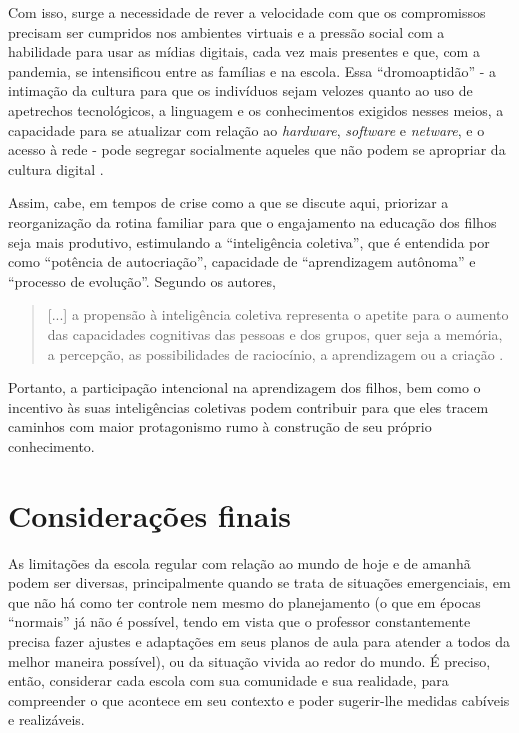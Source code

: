 \documentclass{textolivre}
\begin{document}
Com isso, surge a necessidade de rever a velocidade com que os compromissos precisam ser cumpridos nos ambientes virtuais e a pressão social com a habilidade para usar as mídias digitais, cada vez mais presentes e que, com a pandemia, se intensificou entre as famílias e na escola. Essa “dromoaptidão” - a intimação da cultura para que os indivíduos sejam velozes quanto ao uso de apetrechos tecnológicos, a linguagem e os conhecimentos exigidos nesses meios, a capacidade para se atualizar com relação ao \textit{hardware}, \textit{software} e \textit{netware}, e o acesso à rede - pode segregar socialmente aqueles que não podem se apropriar da cultura digital \cite{boechat_as_2017}.
	
Assim, cabe, em tempos de crise como a que se discute aqui, priorizar a reorganização da rotina familiar para que o engajamento na educação dos filhos seja mais produtivo, estimulando a “inteligência coletiva”, que é entendida por \textcite{lemos_o_2014} como “potência de autocriação”, capacidade de “aprendizagem autônoma” e “processo de evolução”. Segundo os autores,

\begin{quote}
    [...] a propensão à inteligência coletiva representa o apetite para o aumento das capacidades cognitivas das pessoas e dos grupos, quer seja a memória, a percepção, as possibilidades de raciocínio, a aprendizagem ou a criação \cite[p. 14, grifos dos autores]{lemos_o_2014}.
\end{quote}

Portanto, a participação intencional na aprendizagem dos filhos, bem como o incentivo às suas inteligências coletivas podem contribuir para que eles tracem caminhos com maior protagonismo rumo à construção de seu próprio conhecimento.

\section{Considerações finais}\label{sec-organizacao}
As limitações da escola regular com relação ao mundo de hoje e de amanhã podem ser diversas, principalmente quando se trata de situações emergenciais, em que não há como ter controle nem mesmo do planejamento (o que em épocas “normais” já não é possível, tendo em vista que o professor constantemente precisa fazer ajustes e adaptações em seus planos de aula para atender a todos da melhor maneira possível), ou da situação vivida ao redor do mundo. É preciso, então, considerar cada escola com sua comunidade e sua realidade, para compreender o que acontece em seu contexto e poder sugerir-lhe medidas cabíveis e realizáveis.
\end{document}
